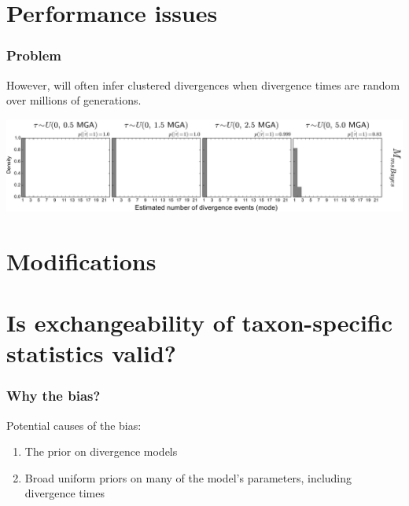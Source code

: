 \section{Performance issues}

\begin{frame}
    \frametitle{Problem}
    However, \msb will often infer clustered divergences when divergence times
    are random over millions of generations.

    \vspace{1cm}
        \centerline{
        \includegraphics[width=1.13\textwidth]{../images/old_old_power_psi_mode.pdf}}
\end{frame}


\section{Modifications}
\section{Is exchangeability of taxon-specific statistics valid?}



\begin{frame}
    \frametitle{Why the bias?}
    Potential causes of the bias:
    \begin{enumerate}
        \item The prior on divergence models
        \item Broad uniform priors on many of the model's parameters, including
            divergence times
    \end{enumerate}
\end{frame}

